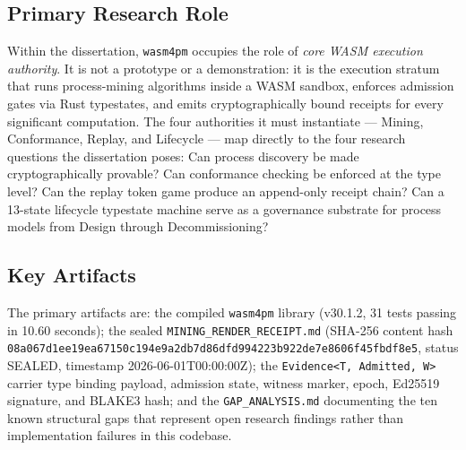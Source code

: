 \subsection{Primary Research Role}
\label{sec:sources-wasm4pm-identity-role}

Within the dissertation, \texttt{wasm4pm} occupies the role of \emph{core WASM execution authority}.
It is not a prototype or a demonstration: it is the execution stratum that runs process-mining
algorithms inside a WASM sandbox, enforces admission gates via Rust typestates, and emits
cryptographically bound receipts for every significant computation. The four authorities it must
instantiate — Mining, Conformance, Replay, and Lifecycle — map directly to the four research
questions the dissertation poses: Can process discovery be made cryptographically provable? Can
conformance checking be enforced at the type level? Can the replay token game produce an
append-only receipt chain? Can a 13-state lifecycle typestate machine serve as a governance
substrate for process models from Design through Decommissioning?

\subsection{Key Artifacts}
\label{sec:sources-wasm4pm-identity-artifacts}

The primary artifacts are: the compiled \texttt{wasm4pm} library (v30.1.2, 31 tests passing in
10.60 seconds); the sealed \texttt{MINING\_RENDER\_RECEIPT.md} (SHA-256 content hash
\texttt{08a067d1ee19ea67150c194e9a2db7d86dfd994223b922de7e8606f45fbdf8e5}, status SEALED,
timestamp 2026-06-01T00:00:00Z); the \texttt{Evidence<T, Admitted, W>} carrier type binding
payload, admission state, witness marker, epoch, Ed25519 signature, and BLAKE3 hash; and the
\texttt{GAP\_ANALYSIS.md} documenting the ten known structural gaps that represent open research
findings rather than implementation failures in this codebase.
